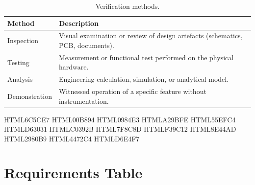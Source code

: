 \begin{table}[H]
    \caption{Verification methods.}
    \label{tab:verif-methods}
    \begin{center}
        \begin{tabular}{C{3cm}L{10cm}}
            \toprule[1.5pt]
            \textbf{Method} & \textbf{Description} \\
            \midrule
            Inspection    & Visual examination or review of design artefacts (schematics, PCB, documents). \\
            Testing       & Measurement or functional test performed on the physical hardware. \\
            Analysis      & Engineering calculation, simulation, or analytical model. \\
            Demonstration & Witnessed operation of a specific feature without instrumentation. \\
            \bottomrule[1.5pt]
        \end{tabular}
    \end{center}
\end{table}

\definecolor{colMission}    {HTML}{6C5CE7}
\definecolor{colFunctional} {HTML}{00B894}
\definecolor{colPhysical}   {HTML}{0984E3}
\definecolor{colInterface}  {HTML}{A29BFE}
\definecolor{colDesign}     {HTML}{55EFC4}
\definecolor{colMechanical} {HTML}{D63031}
\definecolor{colHigh}       {HTML}{C0392B}
\definecolor{colLow}        {HTML}{7F8C8D}
\definecolor{colInspection} {HTML}{F39C12}
\definecolor{colTesting}    {HTML}{8E44AD}
\definecolor{colAnalysis}   {HTML}{2980B9}
\definecolor{colHeader}     {HTML}{4472C4}
\definecolor{rowalt}        {HTML}{D6E4F7}

\newcommand{\typebadge}[2]{\cellcolor{#1}\textcolor{white}{\textbf{\small #2}}}
\newcommand{\opbadge}[2]{\cellcolor{#1}\textcolor{black}{\textbf{\small #2}}}
\newcommand{\verifbadge}[2]{\cellcolor{#1}\textcolor{white}{\textbf{\small #2}}}
\newcommand{\levelbadge}[2]{\cellcolor{#1}\textcolor{white}{\textbf{\small #2}}}
\newcommand{\headerc}[1]{\cellcolor{colHeader}\textcolor{white}{\textbf{#1}}}

\section{Requirements Table}

